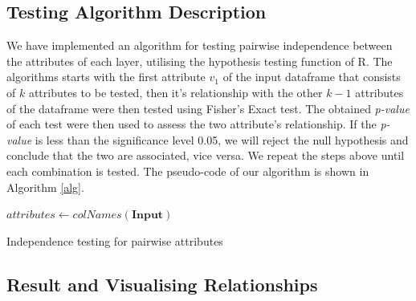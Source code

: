 \documentclass[11pt, oneside]{article}
\begin{document}
\subsection{Testing Algorithm Description}
We have implemented an algorithm for testing pairwise independence between the attributes of each layer, utilising the hypothesis testing function of R. The algorithms starts with the first attribute $v_1$ of the input dataframe that consists of $k$ attributes to be tested, then it's relationship with the other $k-1$ attributes of the dataframe were then tested using Fisher's Exact test. 
\bigbreak
\noindent The obtained \textit{p-value} of each test were then used to assess the two attribute's relationship. If the \textit{p-value} is less than the significance level 0.05, we will reject the null hypothesis and conclude that the two are associated, vice versa. We repeat the steps above until each combination is tested. The pseudo-code of our algorithm is shown in Algorithm \ref{alg}.
\bigbreak
\begin{algorithm}[H]
\SetAlgoLined
{}
 $\textit{attributes}\gets colNames(\textbf{Input})$\;
 \caption{Independence testing for pairwise attributes}
 \label{alg}
\end{algorithm}

\subsection{Result and Visualising Relationships}
\end{document}
